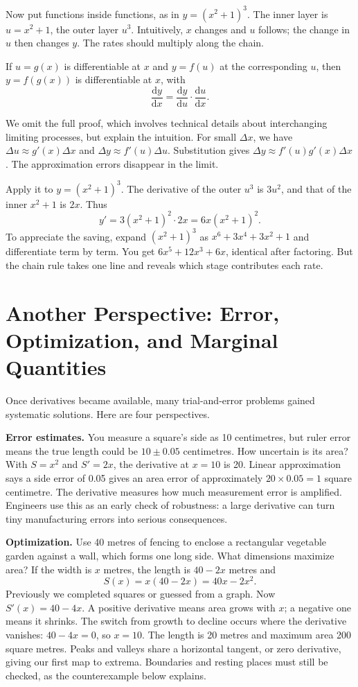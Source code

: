 Now put functions inside functions, as in $y=(x^2+1)^3$. The inner layer is $u=x^2+1$, the outer layer $u^3$. Intuitively, $x$ changes and $u$ follows; the change in $u$ then changes $y$. The rates should multiply along the chain.

\begin{dingli}
If $u=g(x)$ is differentiable at $x$ and $y=f(u)$ at the corresponding $u$, then $y=f(g(x))$ is differentiable at $x$, with
\[
\frac{\mathrm{d}y}{\mathrm{d}x}=\frac{\mathrm{d}y}{\mathrm{d}u}\cdot\frac{\mathrm{d}u}{\mathrm{d}x}.
\]
\end{dingli}

We omit the full proof, which involves technical details about interchanging limiting processes, but explain the intuition. For small $\Delta x$, we have $\Delta u\approx g'(x)\Delta x$ and $\Delta y\approx f'(u)\Delta u$. Substitution gives $\Delta y\approx f'(u)g'(x)\Delta x$. The approximation errors disappear in the limit.

Apply it to $y=(x^2+1)^3$. The derivative of the outer $u^3$ is $3u^2$, and that of the inner $x^2+1$ is $2x$. Thus
\[
y'=3(x^2+1)^2\cdot 2x=6x(x^2+1)^2.
\]
To appreciate the saving, expand $(x^2+1)^3$ as $x^6+3x^4+3x^2+1$ and differentiate term by term. You get $6x^5+12x^3+6x$, identical after factoring. But the chain rule takes one line and reveals which stage contributes each rate.

\section{Another Perspective: Error, Optimization, and Marginal Quantities}

Once derivatives became available, many trial-and-error problems gained systematic solutions. Here are four perspectives.

\textbf{Error estimates.} You measure a square's side as 10 centimetres, but ruler error means the true length could be $10\pm 0.05$ centimetres. How uncertain is its area? With $S=x^2$ and $S'=2x$, the derivative at $x=10$ is 20. Linear approximation says a side error of 0.05 gives an area error of approximately $20\times 0.05=1$ square centimetre. The derivative measures how much measurement error is amplified. Engineers use this as an early check of robustness: a large derivative can turn tiny manufacturing errors into serious consequences.

\textbf{Optimization.} Use 40 metres of fencing to enclose a rectangular vegetable garden against a wall, which forms one long side. What dimensions maximize area? If the width is $x$ metres, the length is $40-2x$ metres and
\[
S(x)=x(40-2x)=40x-2x^2.
\]
Previously we completed squares or guessed from a graph. Now $S'(x)=40-4x$. A positive derivative means area grows with $x$; a negative one means it shrinks. The switch from growth to decline occurs where the derivative vanishes: $40-4x=0$, so $x=10$. The length is 20 metres and maximum area 200 square metres. Peaks and valleys share a horizontal tangent, or zero derivative, giving our first map to extrema. Boundaries and resting places must still be checked, as the counterexample below explains.


